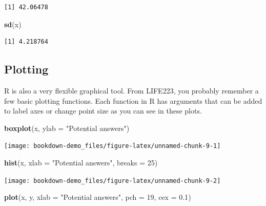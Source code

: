 \documentclass[
]{book}
\newenvironment{Shaded}{\begin{snugshade}}{\end{snugshade}}
\newcommand{\DataTypeTok}[1]{\textcolor[rgb]{0.13,0.29,0.53}{#1}}
\newcommand{\DecValTok}[1]{\textcolor[rgb]{0.00,0.00,0.81}{#1}}
\newcommand{\FloatTok}[1]{\textcolor[rgb]{0.00,0.00,0.81}{#1}}
\newcommand{\KeywordTok}[1]{\textcolor[rgb]{0.13,0.29,0.53}{\textbf{#1}}}
\newcommand{\NormalTok}[1]{#1}
\newcommand{\StringTok}[1]{\textcolor[rgb]{0.31,0.60,0.02}{#1}}
\begin{document}
\begin{verbatim}
[1] 42.06478
\end{verbatim}

\begin{Shaded}
\begin{Highlighting}[]
\KeywordTok{sd}\NormalTok{(x)}
\end{Highlighting}
\end{Shaded}

\begin{verbatim}
[1] 4.218764
\end{verbatim}

\hypertarget{plotting}{%
\subsection{Plotting}\label{plotting}}

R is also a very flexible graphical tool. From LIFE223, you probably remember a few basic plotting functions. Each function in R has arguments that can be added to label axes or change point size as you can see in these plots.

\begin{Shaded}
\begin{Highlighting}[]
\KeywordTok{boxplot}\NormalTok{(x, }\DataTypeTok{ylab =} \StringTok{"Potential answers"}\NormalTok{)}
\end{Highlighting}
\end{Shaded}

\begin{center}\texttt{[image: bookdown-demo\_files/figure-latex/unnamed-chunk-9-1]} \end{center}

\begin{Shaded}
\begin{Highlighting}[]
\KeywordTok{hist}\NormalTok{(x, }\DataTypeTok{xlab =} \StringTok{"Potential answers"}\NormalTok{, }\DataTypeTok{breaks =} \DecValTok{25}\NormalTok{)}
\end{Highlighting}
\end{Shaded}

\begin{center}\texttt{[image: bookdown-demo\_files/figure-latex/unnamed-chunk-9-2]} \end{center}

\begin{Shaded}
\begin{Highlighting}[]
\KeywordTok{plot}\NormalTok{(x, y, }\DataTypeTok{xlab =} \StringTok{"Potential answers"}\NormalTok{, }\DataTypeTok{pch =} \DecValTok{19}\NormalTok{, }\DataTypeTok{cex =} \FloatTok{0.1}\NormalTok{)}
\end{Highlighting}
\end{Shaded}
\end{document}

